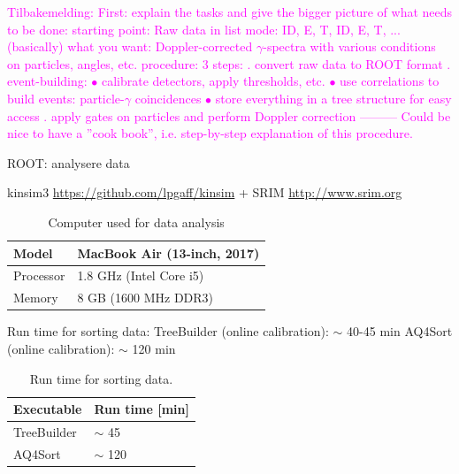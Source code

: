 \documentclass[twoside,english]{uiofysmaster/uiofysmaster}
\begin{document}
\textcolor{Magenta}{Tilbakemelding: \newline
First: explain the tasks and give the bigger picture of what needs to be done: \newline 
starting point: Raw data in list mode: ID, E, T, ID, E, T, ... (basically) \newline
what you want: Doppler-corrected $\gamma$-spectra with various conditions on particles, angles, etc. \newline
procedure: 3 steps: . convert raw data to ROOT format . event-building: \newline
$\bullet$ calibrate detectors, apply thresholds, etc. \newline
$\bullet$ use correlations to build events: particle-$\gamma$ coincidences \newline
$\bullet$ store everything in a tree structure for easy access . apply gates on particles and perform Doppler correction \newline
--------- \newline
Could be nice to have a ''cook book'', i.e. step-by-step explanation of this procedure.
}

\bigskip

ROOT: analysere data

kinsim3 \url{https://github.com/lpgaff/kinsim} + SRIM \url{http://www.srim.org}

\bigskip


\begin{table}[H] 
\centering 
\caption{Computer used for data analysis}
\label{tab:PC}
\begin{tabular}{ll}
\hline
Model & MacBook Air (13-inch, 2017) \\
\hline
Processor & 1.8 GHz (Intel Core i5) \\
Memory & 8 GB (1600 MHz DDR3) \\
\hline
\end{tabular}
\end{table}

Run time for sorting data: \newline
TreeBuilder (online calibration): $\sim$ 40-45 min \newline
AQ4Sort (online calibration): $\sim$ 120 min

\begin{table}[H] 
\centering 
\caption{Run time for sorting data.}
\label{tab:run_time}
\begin{tabular}{ll}
\hline
Executable & Run time [min] \\
\hline
TreeBuilder & $\sim$ 45 \\
AQ4Sort & $\sim$ 120 \\
\hline
\end{tabular}
\end{table}
\end{document}
